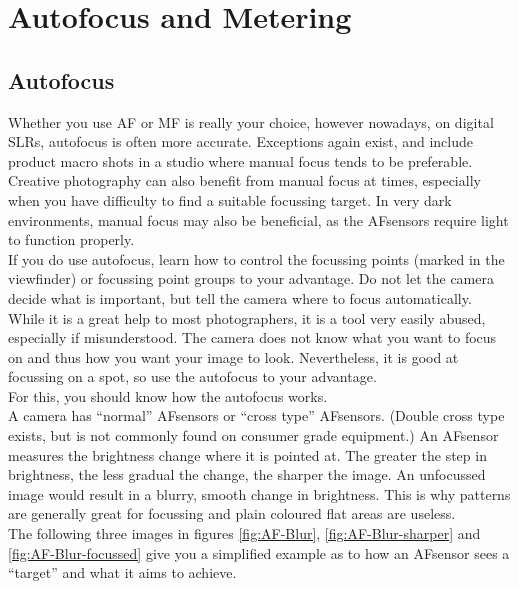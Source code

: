 \chapter{Autofocus and Metering}


\section{Autofocus}
\label{sec:autofocus}

Whether you use \gls{AF} or \gls{MF} is really your choice, however nowadays, on digital \glspl{SLR}, autofocus is often more accurate. Exceptions again exist, and include product macro shots in a studio where manual focus tends to be preferable. Creative photography can also benefit from manual focus at times, especially when you have difficulty to find a suitable focussing target. In very dark environments, manual focus may also be beneficial, as the \glspl{AFsensor} require light to function properly.
\\
If you do use autofocus, learn how to control the focussing points (marked in the \gls{viewfinder}) or focussing point groups to your advantage. Do not let the camera decide what is important, but tell the camera where to focus automatically. While it is a great help to most photographers, it is a tool very easily abused, especially if misunderstood. The camera does not know what you want to focus on and thus how you want your image to look. Nevertheless, it is good at focussing on a spot, so use the autofocus to your advantage.
\\[\baselineskip]
For this, you should know how the autofocus works.
\\
A camera has ``normal'' \glspl{AFsensor} or ``cross type'' \glspl{AFsensor}. (Double cross type exists, but is not commonly found on consumer grade equipment.) An \gls{AFsensor} measures the brightness change where it is pointed at. The greater the step in brightness, the less gradual the change, the sharper the image. An unfocussed image would result in a blurry, smooth change in brightness. This is why patterns are generally great for focussing and plain coloured flat areas are useless.
\\[\baselineskip]
The following three images in figures \ref{fig:AF-Blur}, \ref{fig:AF-Blur-sharper} and \ref{fig:AF-Blur-focussed} give you a simplified example as to how an \gls{AFsensor} sees a ``target'' and what it aims to achieve.

